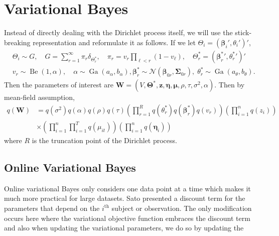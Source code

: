\documentclass[11pt]{article}
\newcommand{\bs}{\boldsymbol}
\newcommand{\opn}{\operatorname}
\begin{document}
\section{Variational Bayes}
Instead of directly dealing with the Dirichlet process itself, we will use the stick-breaking representation and reformulate it as follows. If we let $\Theta_{i}=\left(\bs{\beta}_{i}', \theta_{i}'\right)'$,
\begin{align}
  &\Theta_{i} \sim G, \quad G =\sum_{r=1}^{\infty}\pi_{r}\delta_{\Theta_{r}^{*}}, \quad \pi_{r} = v_{r}\prod_{\ell < r}\left(1-v_{\ell}\right), \quad \Theta_{r}^{*} = \left({\bs{\beta}_{r}^{*}}', {\theta_{r}^{*}}'\right)'\\
  &v_{r} \sim \opn{Be}\left(1,\alpha\right), \quad \alpha \sim \opn{Ga}\left(a_{\alpha}, b_{\alpha}\right), \bs{\beta}_{r}^{*}\sim \mathcal{N}\left(\bs{\beta}_{0r}, \bs{\Sigma}_{0r}\right), \; \theta_{r}^{*}\sim \opn{Ga}\left(a_{\theta}, b_{\theta}\right).
\end{align}
Then the parameters of interest are $\mathbf{W}=\left(V, \bs{\Theta^{*}}, \bs{z}, \bs{\eta}, \bs{\mu}, \rho, \tau, \sigma^{2}, \alpha\right)$. Then by mean-field assumption, 
\begin{align*}
  q\left(\mathbf{W}\right) &= q\left(\sigma^{2}\right)q\left(\alpha\right)q\left(\rho\right)q\left(\tau\right)\left(\prod_{r=1}^{R}q\left(\theta_{r}^{*}\right)q\left(\bs{\beta}_{r}^{*}\right)q\left(v_{r}\right)\right)\left(\prod_{i=1}^{n}q\left(z_{i}\right)\right)\\
  &\times \left(\prod_{i=1}^{n}\prod_{i=1}^{T}q\left(\mu_{it}\right)\right)\left(\prod_{i=1}^{n}q\left(\bs{\eta}_{i}\right)\right)
\end{align*}
where $R$ is the truncation point of the Dirichlet process.
\subsection{Online Variational Bayes}
Online variational Bayes only considers one data point at a time which makes it much more practical for large datasets. Sato presented a discount term for the parameters that depend on the $i^{\text{th}}$ subject or observation. The only modification occurs here where the variational objective function embraces the discount term and also when updating the variational parameters, we do so by updating the 
\end{document}
